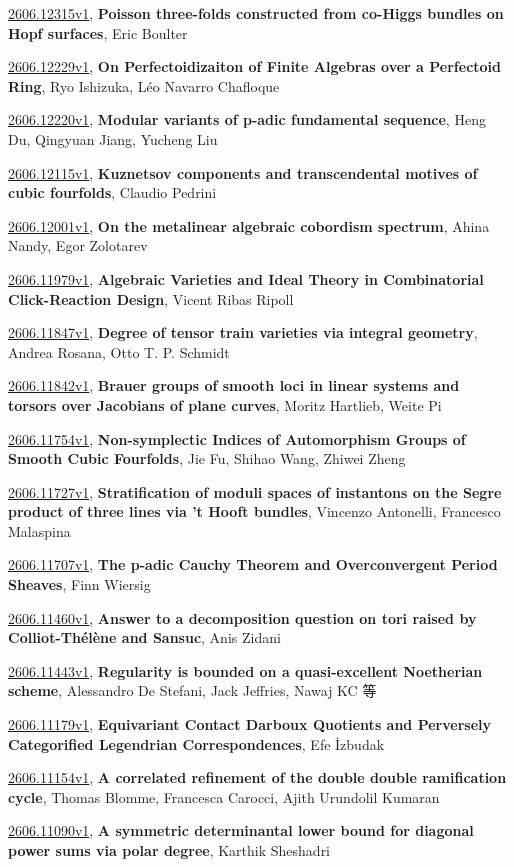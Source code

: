 \documentclass[9pt, a4paper]{article}
\theoremstyle{plain}
\theoremstyle{definition}
\theoremstyle{remark}
\newcommand{\arxiv}[3]{\href{https://arxiv.org/abs/#1}{#1}, \textbf{\textcolor{arxivblue}{#2}}, #3}
\begin{document}
\arxiv{2606.12315v1}{Poisson three-folds constructed from co-Higgs bundles on Hopf surfaces}{Eric Boulter}

\arxiv{2606.12229v1}{On Perfectoidizaiton of Finite Algebras over a Perfectoid Ring}{Ryo Ishizuka, Léo Navarro Chafloque}

\arxiv{2606.12220v1}{Modular variants of p-adic fundamental sequence}{Heng Du, Qingyuan Jiang, Yucheng Liu}

\arxiv{2606.12115v1}{Kuznetsov components and transcendental motives of cubic fourfolds}{Claudio Pedrini}

\arxiv{2606.12001v1}{On the metalinear algebraic cobordism spectrum}{Ahina Nandy, Egor Zolotarev}

\arxiv{2606.11979v1}{Algebraic Varieties and Ideal Theory in Combinatorial Click-Reaction Design}{Vicent Ribas Ripoll}

\arxiv{2606.11847v1}{Degree of tensor train varieties via integral geometry}{Andrea Rosana, Otto T. P. Schmidt}

\arxiv{2606.11842v1}{Brauer groups of smooth loci in linear systems and torsors over Jacobians of plane curves}{Moritz Hartlieb, Weite Pi}

\arxiv{2606.11754v1}{Non-symplectic Indices of Automorphism Groups of Smooth Cubic Fourfolds}{Jie Fu, Shihao Wang, Zhiwei Zheng}

\arxiv{2606.11727v1}{Stratification of moduli spaces of instantons on the Segre product of three lines via 't Hooft bundles}{Vincenzo Antonelli, Francesco Malaspina}

\arxiv{2606.11707v1}{The p-adic Cauchy Theorem and Overconvergent Period Sheaves}{Finn Wiersig}

\arxiv{2606.11460v1}{Answer to a decomposition question on tori raised by Colliot-Thélène and Sansuc}{Anis Zidani}

\arxiv{2606.11443v1}{Regularity is bounded on a quasi-excellent Noetherian scheme}{Alessandro De Stefani, Jack Jeffries, Nawaj KC 等}

\arxiv{2606.11179v1}{Equivariant Contact Darboux Quotients and Perversely Categorified Legendrian Correspondences}{Efe İzbudak}

\arxiv{2606.11154v1}{A correlated refinement of the double double ramification cycle}{Thomas Blomme, Francesca Carocci, Ajith Urundolil Kumaran}

\arxiv{2606.11090v1}{A symmetric determinantal lower bound for diagonal power sums via polar degree}{Karthik Sheshadri}
\end{document}
